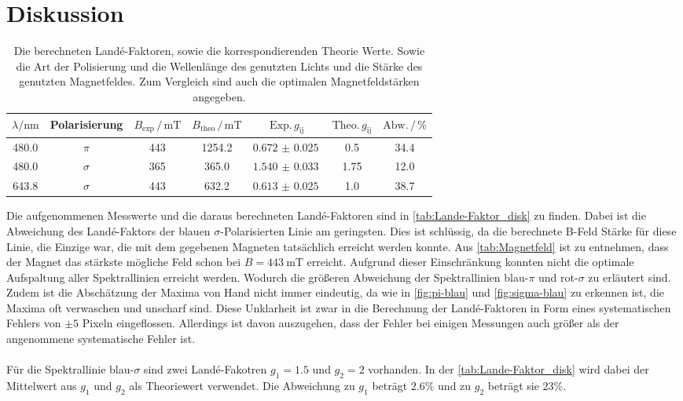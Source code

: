 \section{Diskussion}
\label{sec:Diskussion}
\begin{table}
    \caption{Die berechneten Landé-Faktoren, sowie die korrespondierenden Theorie Werte. Sowie die Art der Polisierung und die Wellenlänge des genutzten Lichts und die Stärke des genutzten Magnetfeldes. Zum Vergleich sind auch die optimalen Magnetfeldstärken angegeben.}
    \begin{tabular}{ccccccc}
        \toprule
        $\lambda / \si{\nano\meter}$ & Polarisierung & $B_\text{exp} \, /\, \si{\milli\tesla}$ &$B_\text{theo} \,/ \,\si{\milli\tesla}$& $\text{Exp.}\,g_\text{ij}$ & $\text{Theo.}\, g _\text{ij}$ & $\text{Abw.}\,/\,\%$\\
        \midrule
        480.0 & $\pi$    & 443 &  1254.2& $\SI{0.672(25)}{}$  & 0.5   &   34.4\\
        480.0 & $\sigma$ & 365 &  365.0 & $\SI{1.540(33)}{}$  & 1.75  &    12.0\\
        643.8 & $\sigma$ & 443 &  632.2 & $\SI{0.613(25)}{}$  & 1.0   &   38.7\\
        \bottomrule
    \end{tabular}
    \label{tab:Lande-Faktor_disk}
\end{table}
Die aufgenommenen Messwerte und die daraus berechneten Landé-Faktoren sind in \autoref{tab:Lande-Faktor_disk} zu finden.
Dabei ist die Abweichung des Landé-Faktors der blauen $\sigma$-Polarisierten Linie am geringsten.
Dies ist schlüssig, da die berechnete B-Feld Stärke für diese Linie, die Einzige war, die mit dem gegebenen Magneten tatsächlich erreicht werden konnte.
Aus \autoref{tab:Magnetfeld} ist zu entnehmen, dass der Magnet das stärkste mögliche Feld schon bei $B = \SI{443}{\milli\tesla}$ erreicht.
Aufgrund dieser Einschränkung konnten nicht die optimale Aufspaltung aller Spektrallinien erreicht werden.
Wodurch die größeren Abweichung der Spektrallinien blau-$\pi$ und rot-$\sigma$ zu erläutert sind.
Zudem ist die Abschätzung der Maxima von Hand nicht immer eindeutig, da wie in \autoref{fig:pi-blau} und \autoref{fig:sigma-blau} zu erkennen ist, die Maxima oft verwaschen und unscharf sind.
Diese Unklarheit ist zwar in die Berechnung der Landé-Faktoren in Form eines systematischen Fehlers von $\pm 5$ Pixeln eingeflossen.
Allerdings ist davon auszugehen, dass der Fehler bei einigen Messungen auch größer als der angenommene systematische Fehler ist.
\\\\
Für die Spektrallinie blau-$\sigma$ sind zwei Landé-Fakotren $g_1 = 1.5$ und $g_2 = 2$ vorhanden.
In der \autoref{tab:Lande-Faktor_disk} wird dabei der Mittelwert aus $g_1$ und $g_2$ als Theoriewert verwendet.
Die Abweichung zu $g_1$ beträgt $2.6\%$ und zu $g_2$ beträgt sie $23\%$.
